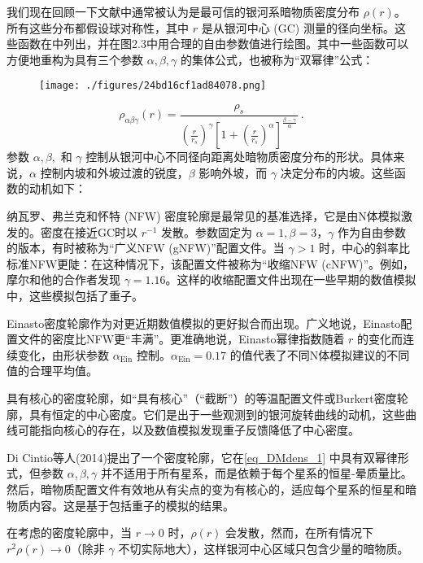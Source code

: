 
 
我们现在回顾一下文献中通常被认为是最可信的银河系暗物质密度分布 \(\rho(r)\)。所有这些分布都假设球对称性，其中 \(r\) 是从银河中心 (GC) 测量的径向坐标。这些函数在中列出，并在图2.3中用合理的自由参数值进行绘图。其中一些函数可以方便地重构为具有三个参数 \(\alpha, \beta, \gamma\) 的集体公式，也被称为“双幂律”公式：

\begin{figure}[ht]
\centering
\texttt{[image: ./figures/24bd16cf1ad84078.png]}
\caption{} \label{fig_DMdens_1}
\end{figure}
\begin{equation}\label{eq_DMdens_1}
\rho_{\alpha\beta\gamma}(r) =  \frac{\rho_s}{ \left(\frac{r}{r_s}\right)^\gamma \left[1 + \left(\frac{r}{r_s}\right)^\alpha\right]^{\frac{\beta-\gamma}{\alpha}}  } ~.
\end{equation}
参数 \(\alpha, \beta,\) 和 \(\gamma\) 控制从银河中心不同径向距离处暗物质密度分布的形状。具体来说，\(\alpha\) 控制内坡和外坡过渡的锐度，\(\beta\) 影响外坡，而 \(\gamma\) 决定分布的内坡。这些函数的动机如下：

纳瓦罗、弗兰克和怀特 (NFW) 密度轮廓是最常见的基准选择，它是由N体模拟激发的。密度在接近GC时以 \(r^{-1}\) 发散。参数固定为 \(\alpha = 1, \beta = 3\)，\(\gamma\) 作为自由参数的版本，有时被称为“广义NFW (gNFW)”配置文件。当 \(\gamma > 1\) 时，中心的斜率比标准NFW更陡：在这种情况下，该配置文件被称为“收缩NFW (cNFW)”。例如，摩尔和他的合作者发现 \(\gamma = 1.16\)。这样的收缩配置文件出现在一些早期的数值模拟中，这些模拟包括了重子。

Einasto密度轮廓作为对更近期数值模拟的更好拟合而出现。广义地说，Einasto配置文件的密度比NFW更“丰满”。更准确地说，Einasto幂律指数随着 \(r\) 的变化而连续变化，由形状参数 \(\alpha_{\text{Ein}}\) 控制。\(\alpha_{\text{Ein}} = 0.17\) 的值代表了不同N体模拟建议的不同值的合理平均值。

具有核心的密度轮廓，如“具有核心”（“截断”）的等温配置文件或Burkert密度轮廓，具有恒定的中心密度。它们是出于一些观测到的银河旋转曲线的动机，这些曲线可能指向核心的存在，以及数值模拟发现重子反馈降低了中心密度。

Di Cintio等人(2014)提出了一个密度轮廓，它在\autoref{eq_DMdens_1} 中具有双幂律形式，但参数 \(\alpha, \beta, \gamma\) 并不适用于所有星系，而是依赖于每个星系的恒星-晕质量比。然后，暗物质配置文件有效地从有尖点的变为有核心的，适应每个星系的恒星和暗物质内容。这是基于包括重子的模拟的结果。

在考虑的密度轮廓中，当 \(r \to 0\) 时，\(\rho(r)\) 会发散，然而，在所有情况下 \(r^2\rho(r) \to 0\)（除非 \(\gamma\) 不切实际地大），这样银河中心区域只包含少量的暗物质。


